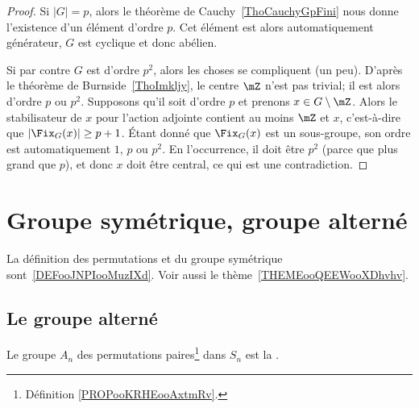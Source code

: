 \begin{proof}
    Si \( | G |=p\), alors le théorème de Cauchy~\ref{ThoCauchyGpFini} nous donne l'existence d'un élément d'ordre \( p\). Cet élément est alors automatiquement générateur, \( G\) est cyclique et donc abélien.

    Si par contre \( G\) est d'ordre \( p^2\), alors les choses se compliquent (un peu). D'après le théorème de Burnside~\ref{ThoImkljy}, le centre \( \mZ\) n'est pas trivial; il est alors d'ordre \( p\) ou \( p^2\). Supposons qu'il soit d'ordre \( p\) et prenons \( x\in G\setminus\mZ\). Alors le stabilisateur de \( x\) pour l'action adjointe contient au moins \( \mZ\) et \( x\), c'est-à-dire que \( |\Fix_G(x)|\geq p+1\). Étant donné que \( \Fix_G(x)\) est un sous-groupe, son ordre est automatiquement \( 1\), \( p\) ou \( p^2\). En l'occurrence, il doit être \( p^2\) (parce que plus grand que \( p\)), et donc \( x\) doit être central, ce qui est une contradiction.
\end{proof}

\section{Groupe symétrique, groupe alterné}
\label{SECooZFYQooFfopMa}

La définition des permutations et du groupe symétrique sont~\ref{DEFooJNPIooMuzIXd}. Voir aussi le thème~\ref{THEMEooQEEWooXDhvhv}.

\subsection{Le groupe alterné}

\begin{definition}      \label{DEFooEIVIooFvVkHH}
    Le groupe \( A_n\) des permutations paires\footnote{Définition \ref{PROPooKRHEooAxtmRv}.} dans \( S_n\) est la .
\end{definition}

